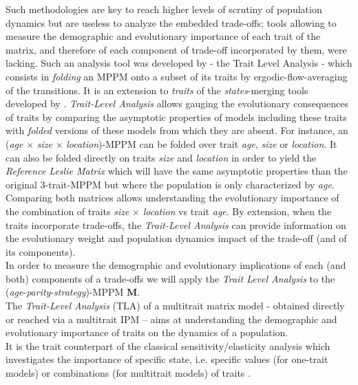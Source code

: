 \documentclass[10pt,a4paper]{article}
\begin{document}
Such methodologies are key to reach  higher levels of scrutiny of population dynamics but are useless to analyze the embedded trade-offs; tools allowing to measure the demographic and evolutionary importance of each trait of the matrix, and therefore of each component of trade-off incorporated by them, were lacking.
Such an analysis tool was developed by \citet{Coste2017} - the Trait Level Analysis - which consists in \emph{folding} an MPPM onto a subset of its traits by ergodic-flow-averaging of the transitions. It is an extension to \emph{traits} of the \emph{states}-merging tools developed by \citet{Enright1995,Hooley2000,Salguero-Gomez2010a}.
\emph{Trait-Level Analysis} allows gauging the evolutionary consequences of traits by comparing the asymptotic properties of models including these traits with \emph{folded} versions of these models from which they are absent.  For instance, an (\emph{age} $\times$ \emph{size} $\times$ \emph{location})-MPPM can be folded over trait \emph{age}, \emph{size} or \emph{location}. It can also be folded directly on traits \emph{size} and \emph{location} in order to yield the \emph{Reference Leslie Matrix} which will have the same asymptotic properties than the original 3-trait-MPPM but where the population is only characterized by \emph{age}.  Comparing both matrices allows understanding the evolutionary importance of the combination of traits \emph{size} $\times$ \emph{location} vs trait \emph{age}. By extension, when the traits incorporate trade-offs, the \emph{Trait-Level Analysis} can provide information on the evolutionary weight and population dynamics impact of the trade-off (and of its components).\\



In order to measure the demographic and evolutionary implications of each (and both) components of a trade-offs we will apply the \emph{Trait Level Analysis} \citep[as described in][]{Coste2017} to the (\emph{age}-\emph{parity}-\emph{strategy})-MPPM $\mathbf{M}$. \\
The \emph{Trait-Level Analysis} (TLA) of a multitrait matrix model - obtained directly or reached via a multitrait IPM – aims at understanding the demographic and evolutionary importance of traits on the dynamics of a population.\\
It is the trait counterpart of the classical sensitivity/elasticity analysis which investigates the importance of specific state, i.e. specific values (for one-trait models) or combinations (for multitrait models) of traits \citep{Goodman1971, DeKroon1986,Caswell1978}.\\
\end{document}
